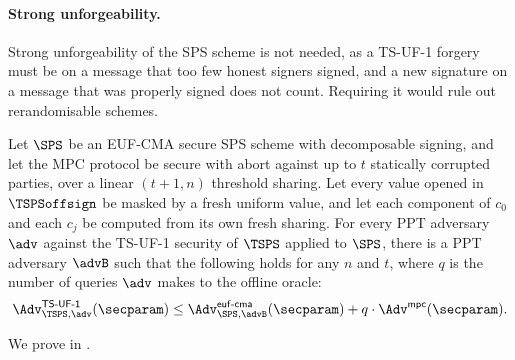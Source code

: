 \paragraph{Strong unforgeability.} Strong unforgeability of the SPS scheme is
not needed, as a TS-UF-1 forgery must be on a message that too few honest
signers signed, and a new signature on a message that was properly signed does
not count. Requiring it would rule out rerandomisable schemes.

\begin{theorem}\label{thm:tsps-construction-security} Let $\SPS$ be an EUF-CMA
secure SPS scheme with decomposable signing, and let the MPC protocol be secure
with abort against up to $t$ statically corrupted parties, over a
linear $(t+1, n)$ threshold sharing. Let every value opened in $\TSPSoffsign$ be
masked by a fresh uniform value, and let each component of $c_0$ and each $c_j$
be computed from its own fresh sharing. For every PPT adversary $\adv$ against the
TS-UF-1 security of $\TSPS$ applied to $\SPS$, there is a PPT adversary $\advB$
such that the following holds for any $n$ and $t$, where $q$ is the number of
queries $\adv$ makes to the offline oracle:
  \begin{equation*}
    \Adv_{\TSPS, \adv}^{\mathsf{TS\text{-}UF\text{-}1}}(\secparam) \leq
\Adv_{\SPS, \advB}^{\mathsf{euf\text{-}cma}}(\secparam) + q \cdot
\Adv^{\mathsf{mpc}}(\secparam).
  \end{equation*}
\end{theorem}

We prove  in
.
